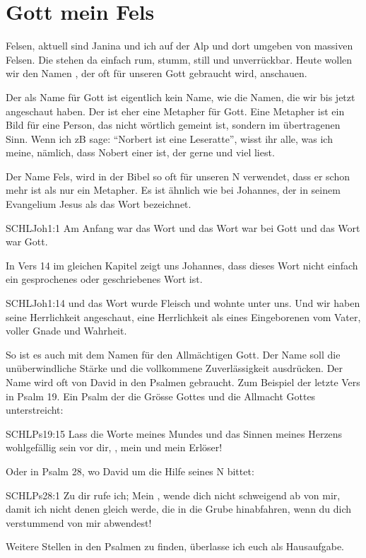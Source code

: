 \section{Gott mein Fels}
\begin{otsblock}[Gottesnamen]
Felsen, aktuell sind Janina und ich auf der Alp und dort umgeben von massiven Felsen. Die stehen da einfach rum, stumm, still und unverrückbar. Heute wollen wir den Namen , der oft für unseren Gott gebraucht wird, anschauen.

Der  als Name für Gott ist eigentlich kein Name, wie die Namen, die wir bis jetzt angeschaut haben. Der  ist eher eine Metapher für Gott. Eine Metapher ist ein Bild für eine Person, das nicht wörtlich gemeint ist, sondern im übertragenen Sinn. Wenn ich zB sage: \enquote{Norbert ist eine Leseratte}, wisst ihr alle, was ich meine, nämlich, dass Nobert einer ist, der gerne und viel liest.

Der Name Fels, wird in der Bibel so oft für unseren \herr N verwendet, dass er schon mehr ist als nur ein Metapher. Es ist ähnlich wie bei Johannes, der in seinem Evangelium Jesus als das Wort bezeichnet.
\begin{bibelbox}{SCHL}{Joh}{1:1}
Am Anfang war das Wort und das Wort war bei Gott und das Wort war Gott.
\end{bibelbox}
In Vers 14 im gleichen Kapitel zeigt uns Johannes, dass dieses Wort nicht einfach ein gesprochenes oder geschriebenes Wort ist.
\begin{bibelbox}{SCHL}{Joh}{1:14}
    und das Wort wurde Fleisch und wohnte unter uns. Und wir haben seine Herrlichkeit angeschaut, eine Herrlichkeit als eines Eingeborenen vom Vater, voller Gnade und Wahrheit.
\end{bibelbox}
So ist es auch mit dem Namen  für den Allmächtigen Gott. Der Name  soll die unüberwindliche Stärke und die vollkommene Zuverlässigkeit ausdrücken. Der Name  wird oft von David in den Psalmen gebraucht. Zum Beispiel der letzte Vers in Psalm 19. Ein Psalm der die Grösse Gottes und die Allmacht Gottes unterstreicht:
\begin{bibelbox}{SCHL}{Ps}{19:15}
Lass die Worte meines Mundes und das Sinnen meines Herzens wohlgefällig sein vor dir, \herr, mein  und mein Erlöser!
\end{bibelbox}
Oder in Psalm 28, wo David um die Hilfe seines \herr N bittet:
\begin{bibelbox}{SCHL}{Ps}{28:1}
Zu dir \herr rufe ich; Mein , wende dich nicht schweigend ab von mir, damit ich nicht denen gleich werde, die in die Grube hinabfahren, wenn du dich verstummend von mir abwendest!
\end{bibelbox}
Weitere Stellen in den Psalmen zu finden, überlasse ich euch als Hausaufgabe.


\end{otsblock}
